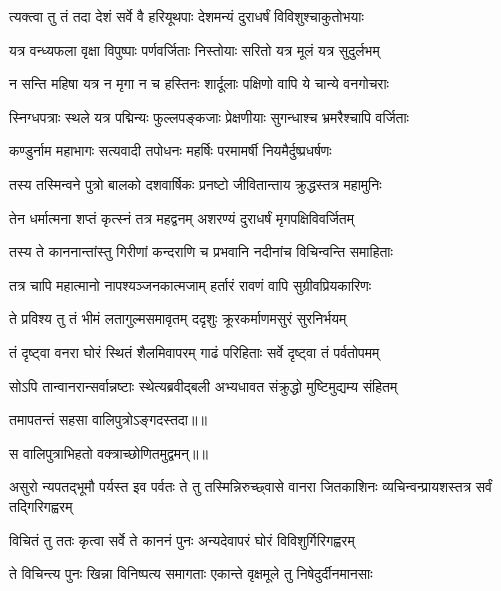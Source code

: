 \twolineshloka
{त्यक्त्वा तु तं तदा देशं सर्वे वै हरियूथपाः}
{देशमन्यं दुराधर्षं विविशुश्चाकुतोभयाः} %

\twolineshloka
{यत्र वन्ध्यफला वृक्षा विपुष्पाः पर्णवर्जिताः}
{निस्तोयाः सरितो यत्र मूलं यत्र सुदुर्लभम्} %

\twolineshloka
{न सन्ति महिषा यत्र न मृगा न च हस्तिनः}
{शार्दूलाः पक्षिणो वापि ये चान्ये वनगोचराः} %

\twolineshloka
{स्निग्धपत्राः स्थले यत्र पद्मिन्यः फुल्लपङ्कजाः}
{प्रेक्षणीयाः सुगन्धाश्च भ्रमरैश्चापि वर्जिताः} %

\twolineshloka
{कण्डुर्नाम महाभागः सत्यवादी तपोधनः}
{महर्षिः परमामर्षी नियमैर्दुष्प्रधर्षणः} %

\twolineshloka
{तस्य तस्मिन्वने पुत्रो बालको दशवार्षिकः}
{प्रनष्टो जीवितान्ताय क्रुद्धस्तत्र महामुनिः} %

\twolineshloka
{तेन धर्मात्मना शप्तं कृत्स्नं तत्र महद्वनम्}
{अशरण्यं दुराधर्षं मृगपक्षिविवर्जितम्} %

\twolineshloka
{तस्य ते काननान्तांस्तु गिरीणां कन्दराणि च}
{प्रभवानि नदीनांच विचिन्वन्ति समाहिताः} %

\twolineshloka
{तत्र चापि महात्मानो नापश्यञ्जनकात्मजाम्}
{हर्तारं रावणं वापि सुग्रीवप्रियकारिणः} %

\twolineshloka
{ते प्रविश्य तु तं भीमं लतागुल्मसमावृतम्}
{ददृशुः क्रूरकर्माणमसुरं सुरनिर्भयम्} %

\twolineshloka
{तं दृष्ट्वा वनरा घोरं स्थितं शैलमिवापरम्}
{गाढं परिहिताः सर्वे दृष्ट्वा तं पर्वतोपमम्} %

\twolineshloka
{सोऽपि तान्वानरान्सर्वान्नष्टाः स्थेत्यब्रवीद्बली}
{अभ्यधावत संक्रुद्धो मुष्टिमुद्यम्य संहितम्} %

{तमापतन्तं सहसा वालिपुत्रोऽङ्गदस्तदा॥॥} %

\addtocounter{shlokacount}{1}

{स वालिपुत्राभिहतो वक्त्राच्छोणितमुद्वमन्॥॥} %

\addtocounter{shlokacount}{1}

\threelineshloka
{असुरो न्यपतद्भूमौ पर्यस्त इव पर्वतः}
{ते तु तस्मिन्निरुच्छ्वासे वानरा जितकाशिनः}
{व्यचिन्वन्प्रायशस्तत्र सर्वं तद्गिरिगह्वरम्} %

\twolineshloka
{विचितं तु ततः कृत्वा सर्वे ते काननं पुनः}
{अन्यदेवापरं घोरं विविशुर्गिरिगह्वरम्} %

\twolineshloka
{ते विचिन्त्य पुनः खिन्ना विनिष्पत्य समागताः}
{एकान्ते वृक्षमूले तु निषेदुर्दीनमानसाः} %



